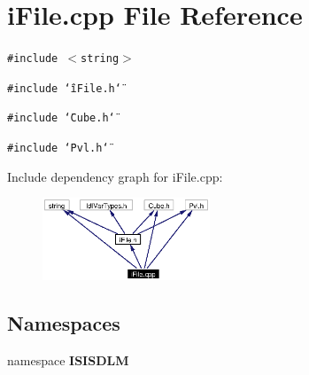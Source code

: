 \section{i\-File.cpp File Reference}
\label{iFile_8cpp}
{\tt \#include $<$string$>$}\par
{\tt \#include \char`\"{}i\-File.h\char`\"{}}\par
{\tt \#include \char`\"{}Cube.h\char`\"{}}\par
{\tt \#include \char`\"{}Pvl.h\char`\"{}}\par


Include dependency graph for i\-File.cpp:\begin{figure}[H]
\begin{center}
\leavevmode
\includegraphics[width=142pt]{iFile_8cpp__incl}
\end{center}
\end{figure}
\subsection*{Namespaces}
\begin{CompactItemize}
\item 
namespace {\bf ISISDLM}
\end{CompactItemize}
